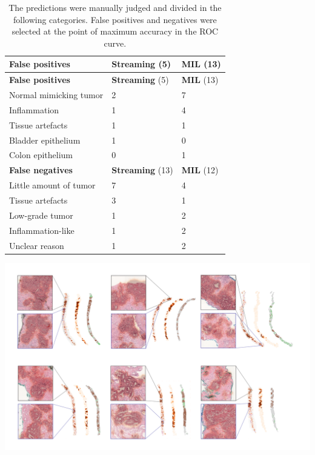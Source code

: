 \documentclass[
  12pt,
  a5,margin=2cmpaper,
]{article}
\begin{document}
\hypertarget{tab:errors}{}
\begin{longtable}[]{@{}lll@{}}
\caption{The predictions were manually judged and divided in the
following categories. False positives and negatives were selected at the
point of maximum accuracy in the ROC curve.}\tabularnewline
\toprule\noalign{}
\textbf{False positives} & \textbf{Streaming} (5) & \textbf{MIL} (13) \\
\midrule\noalign{}
\endfirsthead
\toprule\noalign{}
\textbf{False positives} & \textbf{Streaming} (5) & \textbf{MIL} (13) \\
\midrule\noalign{}
\endhead
\bottomrule\noalign{}
\endlastfoot
Normal mimicking tumor & 2 & 7 \\
Inflammation & 1 & 4 \\
Tissue artefacts & 1 & 1 \\
Bladder epithelium & 1 & 0 \\
Colon epithelium & 0 & 1 \\
\textbf{False negatives} & \textbf{Streaming} (13) & \textbf{MIL}
(12) \\
Little amount of tumor & 7 & 4 \\
Tissue artefacts & 3 & 1 \\
Low-grade tumor & 1 & 2 \\
Inflammation-like & 1 & 2 \\
Unclear reason & 1 & 2 \\
\end{longtable}

\includegraphics{chpt3_imgs/saliency_maps_darker.png}
\end{document}
